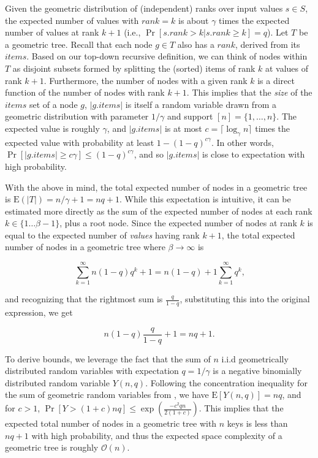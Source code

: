 \documentclass{article}
\begin{document}
Given the geometric distribution of (independent) ranks over input values $s \in S$, the expected number of values with $rank = k$ is about $\gamma$ times the expected number of values at rank $k + 1$ (i.e., $\Pr[s.rank > k | s.rank \geq k] = q$). Let $T$ be a geometric tree. Recall that each node $g \in T$ also has a $rank$, derived from its $items$. Based on our top-down recursive definition, we can think of nodes within $T$ as disjoint subsets formed by splitting the (sorted) items of rank $k$ at values of rank $k + 1$. Furthermore, the number of nodes with a given rank $k$ is a direct function of the number of nodes with rank $k + 1$. This implies that the \emph{size} of the $items$ set of a node $g$, $|g.items|$ is itself a random variable drawn from a geometric distribution with parameter $1/\gamma$ and support $[n] = \{1, \dots, n\}$. The expected value is roughly $\gamma$, and $|g.items|$ is at most $c = \lceil\log_\gamma n\rceil$ times the expected value with probability at least $1 - (1 - q)^{c\gamma}$. In other words, $\Pr[|g.items| \geq c\gamma] \leq (1 - q)^{c\gamma}$, and so $|g.items|$ is close to expectation with high probability.




With the above in mind, the total expected number of nodes in a geometric tree is $\text{E}(|T|) = n/\gamma + 1 = nq + 1$. While this expectation is intuitive, it can be estimated more directly as the sum of the expected number of nodes at each rank $k \in \{1 \dots \beta - 1\}$, plus a root node. Since the expected number of nodes at rank $k$ is equal to the expected number of \emph{values} having rank $k + 1$, the total expected number of nodes in a geometric tree where $\beta \to \infty$ is

$$
    \sum_{k=1}^{\infty} n\left(1 - q\right)q^{k} + 1 = n\left(1 - q\right)  + 1 \sum_{k=1}^{\infty} q^{k} \text{,}
$$

\noindent and recognizing that the rightmost sum is $\frac{q}{1-q}$, substituting this into the original expression, we get

$$
    n (1 - q) \frac{q}{1 - q} + 1 = nq + 1 \text{.}
$$

To derive bounds, we leverage the fact that the sum of $n$ i.i.d geometrically distributed random variables with expectation $q = 1/\gamma$ is a negative binomially distributed random variable $Y(n, q)$. Following the concentration inequality for the sum of geometric random variables from \cite{brown2011how}, we have $\text{E}[Y(n, q)] = nq$, and for $c > 1$, $\Pr[Y > (1 + c)nq] \leq \exp{(\frac{-c^2qn}{2(1 + c)})}$. This implies that the expected total number of nodes in a geometric tree with $n$ keys is less than $nq + 1$ with high probability, and thus the expected space complexity of a geometric tree is roughly $\mathcal{O}(n)$.
\end{document}
